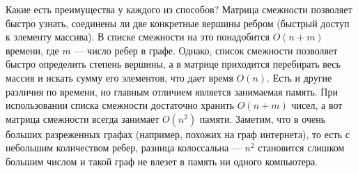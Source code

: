 Какие есть преимущества у каждого из способов? Матрица смежности позволяет
быстро узнать, соединены ли две конкретные вершины ребром (быстрый доступ
к элементу массива). В списке смежности на это понадобится $O(n + m)$
времени, где $m$ --- число ребер в графе. Однако, список смежности позволяет
быстро определить степень вершины, а в матрице приходится перебирать весь
массив и искать сумму его элементов, что дает время $O(n)$. Есть и другие
различия по времени, но главным отличием является занимаемая память. При
использовании списка смежности достаточно хранить $O(n + m)$ чисел,
а вот матрица смежности всегда занимает $O(n^2)$ памяти. Заметим, что
в очень больших разреженных графах (например, похожих на граф интернета), то
есть с небольшим количеством ребер, разница колоссальна --- $n^2$ становится
слишком большим числом и такой граф не влезет в память ни одного компьютера.

